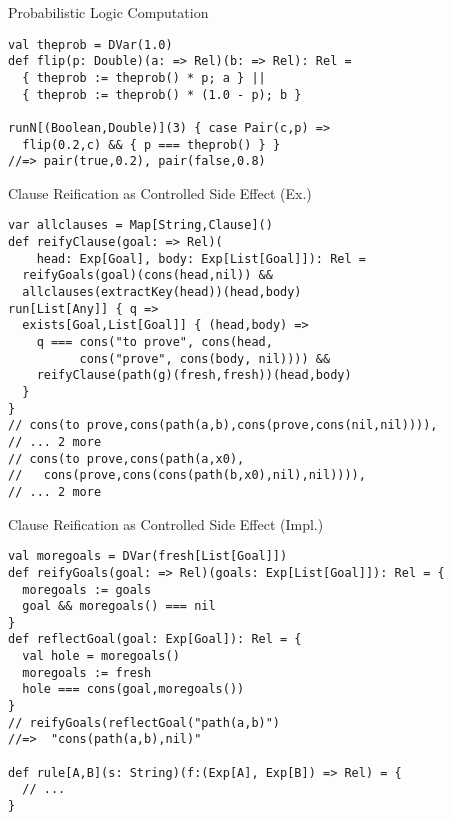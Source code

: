 \documentclass{beamer}
\begin{document}
\begin{frame}[fragile]{Probabilistic Logic Computation}
\begin{verbatim}
val theprob = DVar(1.0)
def flip(p: Double)(a: => Rel)(b: => Rel): Rel =
  { theprob := theprob() * p; a } ||
  { theprob := theprob() * (1.0 - p); b }

runN[(Boolean,Double)](3) { case Pair(c,p) =>
  flip(0.2,c) && { p === theprob() } }
//=> pair(true,0.2), pair(false,0.8)
\end{verbatim}
\end{frame}

\begin{frame}[fragile]{Clause Reification as Controlled Side Effect (Ex.)}
\begin{verbatim}
var allclauses = Map[String,Clause]()
def reifyClause(goal: => Rel)(
    head: Exp[Goal], body: Exp[List[Goal]]): Rel =
  reifyGoals(goal)(cons(head,nil)) &&
  allclauses(extractKey(head))(head,body)
run[List[Any]] { q =>
  exists[Goal,List[Goal]] { (head,body) =>
    q === cons("to prove", cons(head, 
          cons("prove", cons(body, nil)))) &&
    reifyClause(path(g)(fresh,fresh))(head,body)
  }
}
// cons(to prove,cons(path(a,b),cons(prove,cons(nil,nil)))),
// ... 2 more
// cons(to prove,cons(path(a,x0),
//   cons(prove,cons(cons(path(b,x0),nil),nil)))), 
// ... 2 more
\end{verbatim}
\end{frame}

\begin{frame}[fragile]{Clause Reification as Controlled Side Effect (Impl.)}
\begin{verbatim}
val moregoals = DVar(fresh[List[Goal]])
def reifyGoals(goal: => Rel)(goals: Exp[List[Goal]]): Rel = {
  moregoals := goals
  goal && moregoals() === nil
}
def reflectGoal(goal: Exp[Goal]): Rel = {
  val hole = moregoals()
  moregoals := fresh
  hole === cons(goal,moregoals())
}
// reifyGoals(reflectGoal("path(a,b)")
//=>  "cons(path(a,b),nil)"

def rule[A,B](s: String)(f:(Exp[A], Exp[B]) => Rel) = {
  // ...
}
\end{verbatim}
\end{frame}
\end{document}
